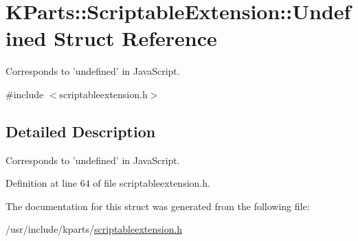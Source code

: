 \hypertarget{structKParts_1_1ScriptableExtension_1_1Undefined}{\section{\-K\-Parts\-:\-:\-Scriptable\-Extension\-:\-:\-Undefined \-Struct \-Reference}
\label{structKParts_1_1ScriptableExtension_1_1Undefined}
}


\-Corresponds to 'undefined' in \-Java\-Script.  




{\ttfamily \#include $<$scriptableextension.\-h$>$}



\subsection{\-Detailed \-Description}
\-Corresponds to 'undefined' in \-Java\-Script. 

\-Definition at line 64 of file scriptableextension.\-h.



\-The documentation for this struct was generated from the following file\-:\begin{DoxyCompactItemize}
\item 
/usr/include/kparts/\hyperlink{scriptableextension_8h}{scriptableextension.\-h}\end{DoxyCompactItemize}
